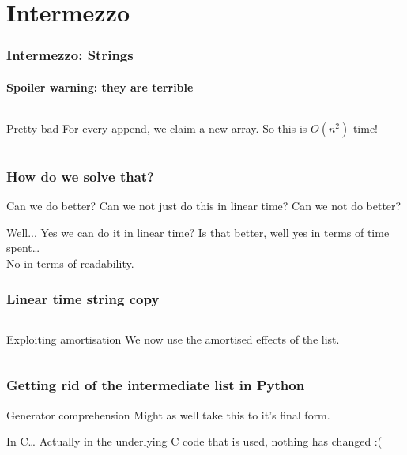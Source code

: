 \section{Intermezzo}
\label{sec:intermezzo}

\begin{frame}
	\frametitle{Intermezzo: Strings}
	\framesubtitle{Spoiler warning: they are terrible}

	\begin{columns}
			
			\begin{alertblock}{Pretty bad}
				For every append, we claim a new array. So this is $O(n^2)$ time!
			\end{alertblock}	
	\end{columns}
\end{frame}

\begin{frame}
	\frametitle{How do we solve that?}
	\begin{questionblock}{Can we do better?}
		Can we not just do this in linear time? Can we not do better?
	\end{questionblock}
	\pause
	\begin{answerblock}{Well...}
		Yes we can do it in linear time? Is that better, well yes in terms of time spent\dots\\
		No in terms of readability.
	\end{answerblock}
\end{frame}

\begin{frame}
	\frametitle{Linear time string copy}
	
	\begin{columns}
		\column{0.455\textwidth}
			
		\column{0.455\textwidth}
				\begin{exampleblock}{Exploiting amortisation}
					We now use the amortised effects of the list.
				\end{exampleblock}			
	\end{columns}
\end{frame}

\begin{frame}
	\frametitle{Getting rid of the intermediate list in Python}
		\begin{exampleblock}{Generator comprehension}
			Might as well take this to it's final form.
		\end{exampleblock}	
		
		\pause
			\begin{alertblock}{In C\dots}
				Actually in the underlying C code that is used, nothing has changed :(
			\end{alertblock}	
\end{frame}

